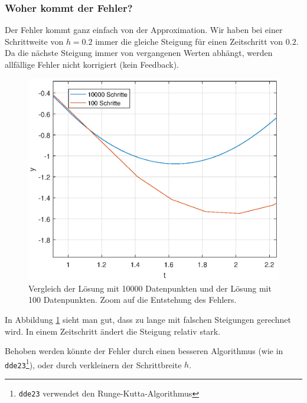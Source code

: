 \subsubsection{Woher kommt der Fehler?}
Der Fehler kommt ganz einfach von der Approximation.
Wir haben bei einer Schrittweite von $h=0.2$ immer die gleiche Steigung für einen Zeitschritt von $0.2$.
Da die nächste Steigung immer von vergangenen Werten abhängt, werden allfällige Fehler nicht korrigiert (kein Feedback).
\begin{figure}
	\centering
	\includegraphics{verzoegert/inp/figures/instab_zoom.eps}
	\caption{Vergleich der Lösung mit 10000 Datenpunkten und der Lösung mit 100 Datenpunkten. Zoom auf die Entstehung des Fehlers.}
	\label{fig:instab_zoom}
\end{figure}
In Abbildung \ref{fig:instab_zoom} sieht man gut, dass zu lange mit falschen Steigungen gerechnet wird.
In einem Zeitschritt ändert die Steigung relativ stark.

Behoben werden könnte der Fehler durch einen besseren Algorithmus (wie in \texttt{dde23}\footnote{\texttt{dde23} verwendet den Runge-Kutta-Algorithmus}), oder durch verkleinern der Schrittbreite $h$.
